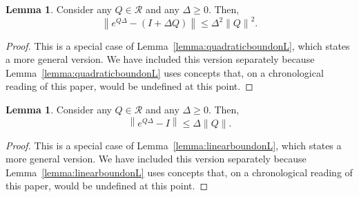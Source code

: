\documentclass[10pt,a4paper]{paper}
\theoremstyle{definition}
\newtheorem{lemma}[theorem]{Lemma}
\newcommand{\reals}{\mathbb{R}}
\newcommand{\realspos}{\reals_{>0}}
\newcommand{\norm}[1]{\left\lVert #1 \right\rVert}
\newcommand{\coloneqq}{:\!=}
\begin{document}
\begin{lemma}\label{lemma:linearpartofexponential}
Consider any $Q\in\mathcal{R}$ and any $\Delta\geq0$. Then,
\begin{equation*}
\norm{e^{Q\Delta}-(I+\Delta Q)}\leq
\Delta^2\norm{Q}^2.
\end{equation*}
\end{lemma}
\begin{proof}
This is a special case of Lemma~\ref{lemma:quadraticboundonL}, which states a more general version. We have included this version separately because Lemma~\ref{lemma:quadraticboundonL} uses concepts that, on a chronological reading of this paper, would be undefined at this point.
%
\end{proof}

\begin{lemma}\label{lemma:linearboundonexponential}
Consider any $Q\in\mathcal{R}$ and any $\Delta\geq0$. Then,
\begin{equation*}
\norm{e^{Q\Delta}-I}\leq
\Delta\norm{Q}.
\end{equation*}
\end{lemma}
\begin{proof}
This is a special case of Lemma~\ref{lemma:linearboundonL}, which states a more general version. We have included this version separately because Lemma~\ref{lemma:linearboundonL} uses concepts that, on a chronological reading of this paper, would be undefined at this point.
\end{proof}
\end{document}
